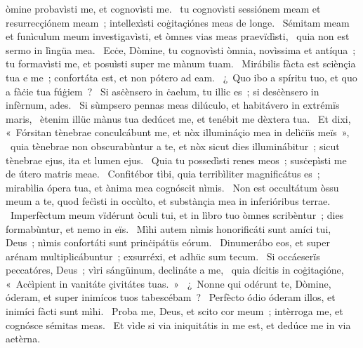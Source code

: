 \psalmChapterWithInscription{}
{ }
{%
òmine probavìsti me, et cognovìsti me. 
~tu cognovìsti sessiónem meam et resurrecçiónem meam~; intellexìsti coġitaçiónes meas de longe. 
~Sémitam meam et funìculum meum investigavìsti, et òmnes vias meas praevïdìsti, 
~quia non est sermo in lìngüa mea. 
~Ecċe, Dòmine, tu cognovìsti òmnia, novìssima et antíqua~; tu formavìsti me, et posuìsti super me mànum tuam. 
~Mirábilis fàcta est sciènçia tua e me~; confortáta est, et non pótero ad eam. 
~¿~Quo ibo a spíritu tuo, et quo a fàċie tua fúġiem~? 
~Si asċènsero in ċaelum, tu illic es~; si desċènsero in infèrnum, ades. 
~Si sùmpsero pennas meas dilúculo, et habitávero in extrémïs maris, 
~ètenim illüc mànus tua dedúcet me, et tenébit me dèxtera tua. 
~Et dixi, «~Fórsitan tènebrae conculcábunt me, et nòx illumináçio mea in delìċiïs meïs~», 
~quia tènebrae non obscurabùntur a te, et nòx sicut dies illuminábitur~; sicut tènebrae ejus, ita et lumen ejus. 
~Quia tu possedìsti renes meos~; susċepìsti me de útero matris meae. 
~Confitébor tìbi, quia terribìliter magnificátus es~; mirabìlia ópera tua, et ànima mea cognóscit nìmis. 
~Non est occultátum òssu meum a te, quod feċìsti in occùlto, et substànçia mea in inferióribus terrae. 
~Imperfèctum meum vïdérunt òculi tui, et in lìbro tuo òmnes scribèntur~; dies formabùntur, et nemo in eïs. 
~Mìhi autem nìmis honorificáti sunt amíci tui, Deus~; nìmis confortáti sunt prinċipátüs eórum. 
~Dinumerábo eos, et super arénam multiplicábuntur~; exsurréxi, et adhüc sum tecum. 
~Si occáeserïs peccatóres, Deus~; vìri sángüinum, declináte a me, 
~quia dícitis in coġitaçióne, «~Acċìpient in vanitáte çivitátes tuas.~»
~¿~Nonne qui odérunt te, Dòmine, óderam, et super inimícos tuos tabescébam~? 
~Perfècto ódio óderam illos, et inimíci fàcti sunt mìhi. 
~Proba me, Deus, et scito cor meum~; intèrroga me, et cognósce sémitas meas. 
~Et vìde si via iniquitátis in me est, et dedúce me in via aetèrna. 
}
